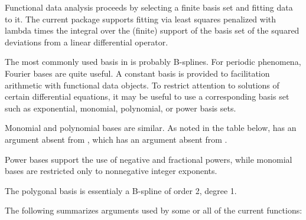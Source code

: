 \begin{Description}\relax
Functional data analysis proceeds by selecting a finite basis set and
fitting data to it.  The current  package supports fitting
via least squares penalized with lambda times the integral over the
(finite) support of the basis set of the squared deviations from a
linear differential operator.
\end{Description}
\begin{Details}\relax
The most commonly used basis in  is probably B-splines.  For
periodic phenomena, Fourier bases are quite useful.  A constant basis
is provided to facilitation arithmetic with functional data objects.
To restrict attention to solutions of certain differential equations,
it may be useful to use a corresponding basis set such as exponential,
monomial, polynomial, or power basis sets.

Monomial and polynomial bases are similar.  As noted in the table
below,  has an argument 
absent from , which has an argument
 absent from .

Power bases support the use of negative and fractional powers, while
monomial bases are restricted only to nonnegative integer exponents.

The polygonal basis is essentialy a B-spline of order 2, degree 1.

The following summarizes arguments used by some or all of the current
 functions:

\end{Details}
